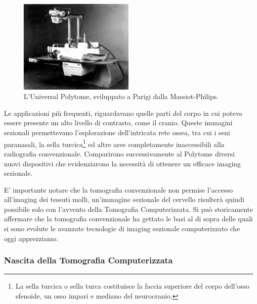 \documentclass[a4paper,11pt, oneside]{article}
\begin{document}
                        \begin{figure}[h]
                            \centering
                            \includegraphics[width=0.5\textwidth]{polytome}
                            \caption{L'Universal Polytome, sviluppato a Parigi dalla Massiot-Philips.}
                            \label{fig:polytome}
                        \end{figure}
                    
                        
                        Le applicazioni più frequenti, riguardavano quelle parti del corpo in cui poteva essere presente un alto livello di contrasto, come il cranio. Queste immagini sezionali permettevano l’esplorazione dell’intricata rete ossea, tra cui i seni paranasali, la sella turcica\footnote{La sella turcica o sella turca costituisce la faccia superiore del corpo dell'osso sfenoide, un osso impari e mediano del neurocranio.} ed altre aree completamente inaccessibili alla radiografia convenzionale. Comparirono successivamente al Polytome diversi nuovi dispositivi che evidenziarono la necessità di ottenere un efficace imaging sezionale.
                    \par
                        E’ importante notare che la tomografia convenzionale non permise l’accesso all’imaging dei tessuti molli, un’immagine sezionale del cervello risulterà quindi possibile solo con l’avvento della Tomografia Computerizzata. Si può storicamente affermare che la tomografia convenzionale ha gettato le basi al di sopra delle quali si sono evolute le avanzate tecnologie di imaging sezionale computerizzato che oggi apprezziamo.
                    
                \subsubsection{Nascita della Tomografia Computerizzata}
                    \par
                        
\end{document}
